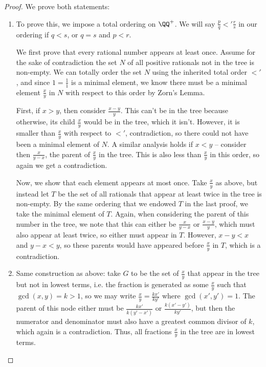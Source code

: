 \documentclass[12pt]{scrartcl}
\begin{document}
\begin{proof}
	We prove both statements:
	\begin{enumerate}
		\item To prove this, we impose a total ordering on $\QQ^+$. We will say $\frac{p}{q} <' \frac{r}{s}$ in our ordering if $q < s$, or $q = s$ and $p < r$.

		      We first prove that every rational number appears at least once. Assume for the sake of contradiction the set $N$ of all positive rationals not in the tree is non-empty. We can totally order the set $N$ using the inherited total order $<'$, and since $1 = \frac 11$ is a minimal element, we know there must be a minimal element $\frac x y$ in $N$ with respect to this order by Zorn's Lemma.

		      First, if $x > y$, then consider $\frac{x-y}{y}$. This can't be in the tree because otherwise, its child $\frac{x}{y}$ would be in the tree, which it isn't. However, it is smaller than $\frac x y$ with respect to $<'$, contradiction, so there could not have been a minimal element of $N$. A similar analysis holds if $x < y$ -- consider then $\frac x {y-x}$, the parent of $\frac xy$ in the tree. This is also less than $\frac xy$ in this order, so again we get a contradiction.

		      Now, we show that each element appears at most once. Take $\frac xy$ as above, but instead let $T$ be the set of all rationals that appear at least twice in the tree is non-empty. By the same ordering that we endowed $T$ in the last proof, we take the minimal element of $T$. Again, when considering the parent of this number in the tree, we note that this can either be $\frac{x}{y-x}$ or $\frac{x-y}{y}$, which must also appear at least twice, so either must appear in $T$. However, $x - y < x$ and $y - x < y$, so these parents would have appeared before $\frac{x}{y}$ in $T$, which is a contradiction.

		\item Same construction as above: take $G$ to be the set of $\frac xy$ that appear in the tree but not in lowest terms, i.e. the fraction is generated as some $\frac xy$ such that $\gcd(x, y) = k > 1$, so we may write $\frac{x}{y} = \frac{kx'}{ky'}$ where $\gcd(x', y') = 1$.  The parent of this node either must be $\frac{kx'}{k(y'-x')}$ or $\frac{k(x'-y')}{ky'}$, but then the numerator and denominator must also have a greatest common divisor of $k$, which again is a contradiction. Thus, all fractions $\frac{x}{y}$ in the tree are in lowest terms.
	\end{enumerate}
\end{proof}
\end{document}
